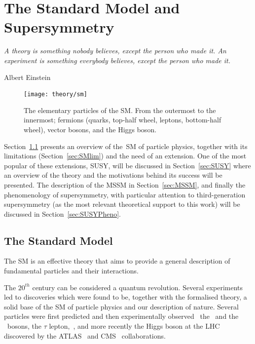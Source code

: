 \chapter{The Standard Model and Supersymmetry}
\label{ch:theory} 
\epigraph{\emph{A theory is something nobody believes, except the person who made it. An experiment is something everybody believes, except the person who made it.}} {Albert Einstein}

	\begin{figure}
		\centering
			\texttt{[image: theory/sm]}
		\caption{\label{fig:sm_el_part} The elementary particles of the \ac{SM}. From the outermost to the innermost; fermions (quarks, top-half wheel, leptons, bottom-half wheel), vector bosons, and the Higgs boson.}
	\end{figure}				

	Section~\ref{sec:SMov} presents an overview of the~\ac{SM} of particle physics, together with its limitations (Section~\ref{sec:SMlim}) and the need of an extension. One of the most popular of these extensions, \ac{SUSY}, will be discussed in Section~\ref{sec:SUSY} where an overview of the theory and the motivations behind its success will be presented. The description of the \ac{MSSM} in Section~\ref{sec:MSSM}, and finally the phenomenology of supersymmetry, with particular attention to third-generation supersymmetry (as the most relevant theoretical support to this work) will be discussed in Section~\ref{sec:SUSYPheno}.


	\section{The Standard Model}
	\label{sec:SMov}

		The \ac{SM} is an effective theory that aims to provide a general description of fundamental particles and their interactions. %

		The $20^{th}$ century can be considered a quantum revolution. Several experiments led to discoveries which were found to be, together with the formalised theory, a solid base of the \ac{SM} of particle physics and our description of nature. Several particles were first predicted and then experimentally observed \eg\ the \Wboson\ and the \Zboson\ bosons, the $\tau$ lepton,~\cite{Herrero1998}, and more recently the Higgs boson at the \ac{LHC} discovered by the \acs{ATLAS}~\cite{ATLASHiggs2012} and \acs{CMS}~\cite{CMSHiggs2012} collaborations.

